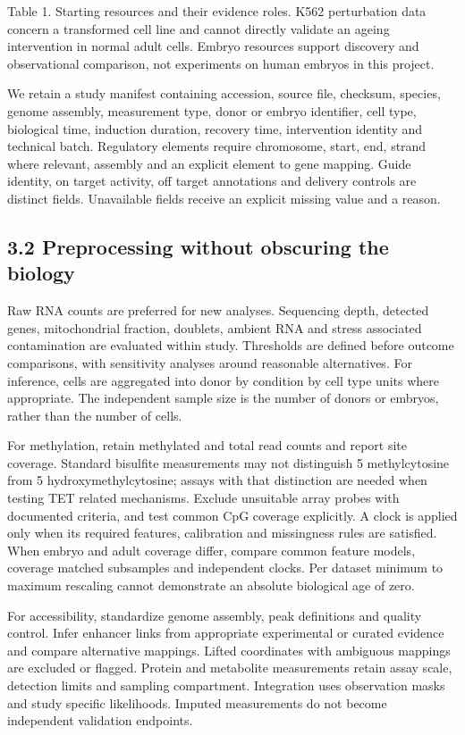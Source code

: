 \documentclass[
  11pt,
  letterpaper,
]{article}
\begin{document}
Table 1. Starting resources and their evidence roles. K562 perturbation
data concern a transformed cell line and cannot directly validate an
ageing intervention in normal adult cells. Embryo resources support
discovery and observational comparison, not experiments on human embryos
in this project.

We retain a study manifest containing accession, source file, checksum,
species, genome assembly, measurement type, donor or embryo identifier,
cell type, biological time, induction duration, recovery time,
intervention identity and technical batch. Regulatory elements require
chromosome, start, end, strand where relevant, assembly and an explicit
element to gene mapping. Guide identity, on target activity, off target
annotations and delivery controls are distinct fields. Unavailable
fields receive an explicit missing value and a reason.

\hypertarget{preprocessing-without-obscuring-the-biology}{%
\subsection{3.2 Preprocessing without obscuring the
biology}\label{preprocessing-without-obscuring-the-biology}}

Raw RNA counts are preferred for new analyses. Sequencing depth,
detected genes, mitochondrial fraction, doublets, ambient RNA and stress
associated contamination are evaluated within study. Thresholds are
defined before outcome comparisons, with sensitivity analyses around
reasonable alternatives. For inference, cells are aggregated into donor
by condition by cell type units where appropriate. The independent
sample size is the number of donors or embryos, rather than the number
of cells.

For methylation, retain methylated and total read counts and report site
coverage. Standard bisulfite measurements may not distinguish 5
methylcytosine from 5 hydroxymethylcytosine; assays with that
distinction are needed when testing TET related mechanisms. Exclude
unsuitable array probes with documented criteria, and test common CpG
coverage explicitly. A clock is applied only when its required features,
calibration and missingness rules are satisfied. When embryo and adult
coverage differ, compare common feature models, coverage matched
subsamples and independent clocks. Per dataset minimum to maximum
rescaling cannot demonstrate an absolute biological age of zero.

For accessibility, standardize genome assembly, peak definitions and
quality control. Infer enhancer links from appropriate experimental or
curated evidence and compare alternative mappings. Lifted coordinates
with ambiguous mappings are excluded or flagged. Protein and metabolite
measurements retain assay scale, detection limits and sampling
compartment. Integration uses observation masks and study specific
likelihoods. Imputed measurements do not become independent validation
endpoints.
\end{document}
